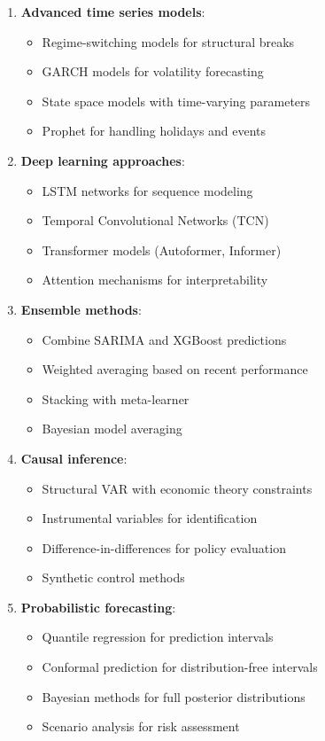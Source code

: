 \documentclass[12pt]{article}
\begin{document}
\begin{enumerate}
    \item \textbf{Advanced time series models}:
    \begin{itemize}
        \item Regime-switching models for structural breaks
        \item GARCH models for volatility forecasting
        \item State space models with time-varying parameters
        \item Prophet for handling holidays and events
    \end{itemize}

    \item \textbf{Deep learning approaches}:
    \begin{itemize}
        \item LSTM networks for sequence modeling
        \item Temporal Convolutional Networks (TCN)
        \item Transformer models (Autoformer, Informer)
        \item Attention mechanisms for interpretability
    \end{itemize}

    \item \textbf{Ensemble methods}:
    \begin{itemize}
        \item Combine SARIMA and XGBoost predictions
        \item Weighted averaging based on recent performance
        \item Stacking with meta-learner
        \item Bayesian model averaging
    \end{itemize}

    \item \textbf{Causal inference}:
    \begin{itemize}
        \item Structural VAR with economic theory constraints
        \item Instrumental variables for identification
        \item Difference-in-differences for policy evaluation
        \item Synthetic control methods
    \end{itemize}

    \item \textbf{Probabilistic forecasting}:
    \begin{itemize}
        \item Quantile regression for prediction intervals
        \item Conformal prediction for distribution-free intervals
        \item Bayesian methods for full posterior distributions
        \item Scenario analysis for risk assessment
    \end{itemize}
\end{enumerate}
\end{document}
